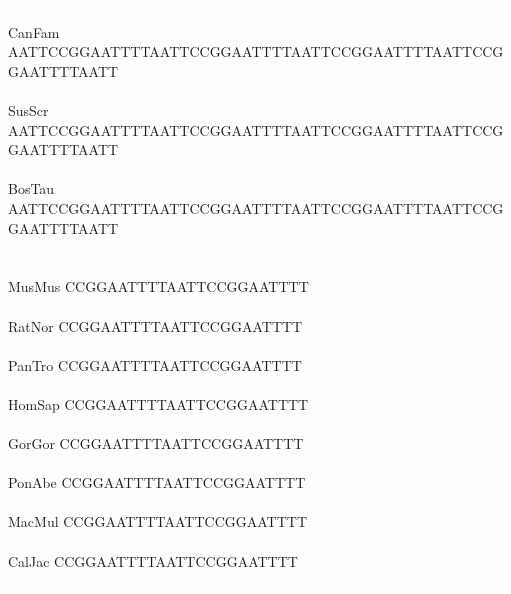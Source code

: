 \documentclass[11pt,twoside,reqno,a4paper]{article}
\begin{document}
{\textcolor{white}{EquCab	}\ \ \ \ \ \ \ \ \ \ \ \ \ \ \ \ \ \ \ \ \ \ \ \ \ \ \ \ \ \ \ \ \ \ \ \ \ \ \ \ \ \ \ \ \ \ \ \ \ \ \ \ \ \ \ \ \ \ \ \ \\
CanFam	AATTCCGGAATTTTAATTCCGGAATTTTAATTCCGGAATTTTAATTCCGGAATTTTAATT\\
\textcolor{white}{CanFam	}\ \ \ \ \ \ \ \ \ \ \ \ \ \ \ \ \ \ \ \ \ \ \ \ \ \ \ \ \ \ \ \ \ \ \ \ \ \ \ \ \ \ \ \ \ \ \ \ \ \ \ \ \ \ \ \ \ \ \ \ \\
SusScr	AATTCCGGAATTTTAATTCCGGAATTTTAATTCCGGAATTTTAATTCCGGAATTTTAATT\\
\textcolor{white}{SusScr	}\ \ \ \ \ \ \ \ \ \ \ \ \ \ \ \ \ \ \ \ \ \ \ \ \ \ \ \ \ \ \ \ \ \ \ \ \ \ \ \ \ \ \ \ \ \ \ \ \ \ \ \ \ \ \ \ \ \ \ \ \\
BosTau	AATTCCGGAATTTTAATTCCGGAATTTTAATTCCGGAATTTTAATTCCGGAATTTTAATT\\
\textcolor{white}{BosTau	}\ \ \ \ \ \ \ \ \ \ \ \ \ \ \ \ \ \ \ \ \ \ \ \ \ \ \ \ \ \ \ \ \ \ \ \ \ \ \ \ \ \ \ \ \ \ \ \ \ \ \ \ \ \ \ \ \ \ \ \ \\
\\
MusMus	CCGGAATTTTAATTCCGGAATTTT\\
\textcolor{white}{MusMus	}\ \ \ \ \ \ \ \ \ \ \ \ \ \ \ \ \ \ \ \ \ \ \ \ \\
RatNor	CCGGAATTTTAATTCCGGAATTTT\\
\textcolor{white}{RatNor	}\ \ \ \ \ \ \ \ \ \ \ \ \ \ \ \ \ \ \ \ \ \ \ \ \\
PanTro	CCGGAATTTTAATTCCGGAATTTT\\
\textcolor{white}{PanTro	}\ \ \ \ \ \ \ \ \ \ \ \ \ \ \ \ \ \ \ \ \ \ \ \ \\
HomSap	CCGGAATTTTAATTCCGGAATTTT\\
\textcolor{white}{HomSap	}\ \ \ \ \ \ \ \ \ \ \ \ \ \ \ \ \ \ \ \ \ \ \ \ \\
GorGor	CCGGAATTTTAATTCCGGAATTTT\\
\textcolor{white}{GorGor	}\ \ \ \ \ \ \ \ \ \ \ \ \ \ \ \ \ \ \ \ \ \ \ \ \\
PonAbe	CCGGAATTTTAATTCCGGAATTTT\\
\textcolor{white}{PonAbe	}\ \ \ \ \ \ \ \ \ \ \ \ \ \ \ \ \ \ \ \ \ \ \ \ \\
MacMul	CCGGAATTTTAATTCCGGAATTTT\\
\textcolor{white}{MacMul	}\ \ \ \ \ \ \ \ \ \ \ \ \ \ \ \ \ \ \ \ \ \ \ \ \\
CalJac	CCGGAATTTTAATTCCGGAATTTT\\
\textcolor{white}{CalJac	}\ \ \ \ \ \ \ \ \ \ \ \ \ \ \ \ \ \ \ \ \ \ \ \ \\
}
\end{document}

